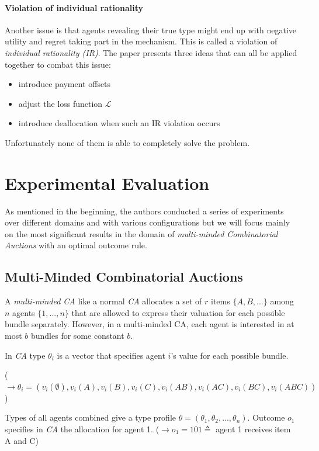 \documentclass[]{article}
\begin{document}
\paragraph{Violation of individual rationality} Another issue is that agents revealing their true type might end up with negative utility and regret taking part in the mechanism. This is called a violation of \emph{individual rationality (IR)}. The paper presents three ideas that can all be applied together to combat this issue:
\begin{itemize}
	\item introduce payment offsets
	\item adjust the loss function $\mathcal{L}$
	\item introduce deallocation when such an IR violation occurs
\end{itemize}

\noindent Unfortunately none of them is able to completely solve the problem.

\section{Experimental Evaluation}
As mentioned in the beginning, the authors conducted a series of experiments over different domains and with various configurations but we will focus mainly on the most significant results in the domain of \emph{multi-minded Combinatorial Auctions} with an optimal outcome rule.

\subsection{Multi-Minded Combinatorial Auctions}
A \emph{multi-minded CA} like a normal \emph{CA} allocates a set of $r$ items $\{A, B, ...\}$ among $n$ agents  $\{1,..., n\}$ that are allowed to express their valuation for each possible bundle separately. However, in a multi-minded CA, each agent is interested in at most $b$ bundles for some constant $b$.

\noindent In \emph{CA} type $\theta_{i}$  is a vector that specifies agent $i$'s value for each possible bundle.

\noindent ($\rightarrow \theta_{i}=(v_{i}(\emptyset),v_{i}(A),v_{i}(B),v_{i}(C),v_{i}(AB),v_{i}(AC),v_{i}(BC),v_{i}(ABC))$)

\noindent Types of all agents combined give a type profile $\theta = (\theta_{1}, \theta_{2}, ..., \theta_{n})$. Outcome $o_{1}$ specifies in \emph{CA} the allocation for agent 1. ($\rightarrow o_{1} = 101 \triangleq $ agent 1  receives item A and C)
\end{document}
